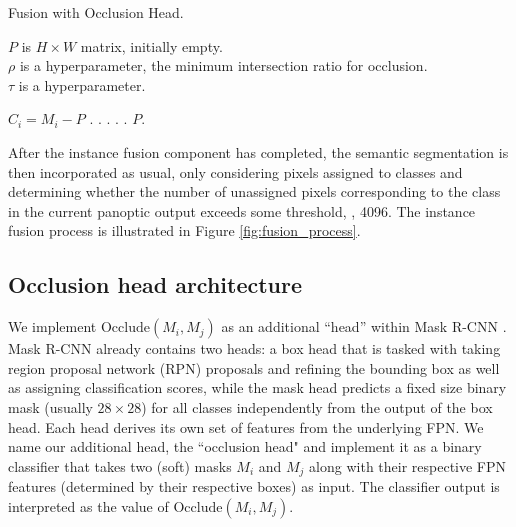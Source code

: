 \documentclass[10pt,twocolumn,letterpaper]{article}
\begin{document}
\begin{algorithm}[!htp]
\caption{\small Fusion with Occlusion Head.}
$P$ is $H \times W$ matrix, initially empty.\\
$\rho$ is a hyperparameter, the minimum intersection ratio for occlusion. \\
$\tau$ is a hyperparameter.

\label{al:fusion-procedure}
\begin{algorithmic}
{
{\small
{}
    \State $C_i = M_i - P$ 
     
        .
        .
        .        
         
        .
        .
        \EndIf
        \EndIf
    \EndFor
         \Else
         $P$.
    \EndIf
\EndFor
}
}
\end{algorithmic}

\end{algorithm}



After the instance fusion component has completed, the semantic segmentation is then incorporated as usual, only considering pixels assigned to  classes and determining whether the number of unassigned pixels corresponding to the class in the current panoptic output exceeds some threshold, \eg, 4096. The instance fusion process is illustrated in Figure \ref{fig:fusion_process}.



\subsection{Occlusion head architecture}
\label{sec:architecture_of_occlusion_head}
We implement $\text{Occlude}(M_i, M_j)$ as an additional ``head'' within Mask R-CNN \cite{he2017mask}. Mask R-CNN already contains two heads: a box head that is tasked with taking region proposal network (RPN) proposals and refining the bounding box as well as assigning classification scores, while the mask head predicts a fixed size binary mask (usually $28 \times 28$) for all classes independently from the output of the box head. Each head derives its own set of features from the underlying FPN. We name our additional head, the ``occlusion head" and implement it as a binary classifier that takes two (soft) masks $M_i$ and $M_j$ along with their respective FPN features (determined by their respective boxes) as input. The classifier output is interpreted as the value of $\text{Occlude}(M_i, M_j)$.
\end{document}
